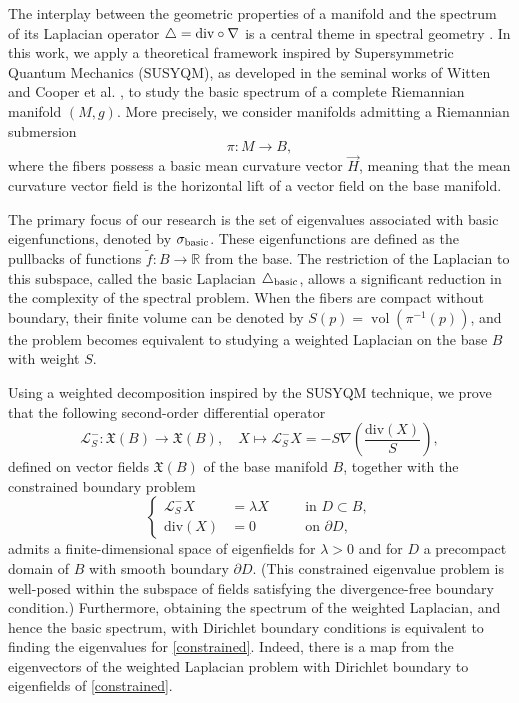 \documentclass{amsart}
\theoremstyle{definition}
\theoremstyle{remark}
\numberwithin{equation}{section}
\newcommand{\diver}{{{\mathrm{div}}}}
\begin{document}
The interplay between the geometric properties of a manifold and the spectrum of its Laplacian operator $\triangle={\rm div}\circ \nabla$ is a central theme in spectral geometry \cite{Chavel, Kac, Pol2, YauReview}. In this work, we apply a theoretical framework inspired by Supersymmetric Quantum Mechanics (SUSYQM), as developed in the seminal works of Witten \cite{Witten1982} and Cooper et al. \cite{CooperKhareSukhatme1995}, to study the basic spectrum of a complete Riemannian manifold $(M, g)$. More precisely, we consider manifolds admitting a Riemannian submersion 
\begin{equation}
\pi\colon M \to B,
\end{equation}
where the fibers possess a basic mean curvature vector $\vec{H}$, meaning that the mean curvature vector field is the horizontal lift of a vector field on the base manifold.

The primary focus of our research is the set of eigenvalues associated with basic eigenfunctions, denoted by $\sigma_{\rm basic}$. These eigenfunctions are defined as the pullbacks of functions $\widetilde{f}: B \to \mathbb{R}$ from the base. The restriction of the Laplacian to this subspace, called the basic Laplacian $\triangle_{\rm basic}$, allows a significant reduction in the complexity of the spectral problem. When the fibers are compact without boundary, their finite volume can be denoted by $S(p)=\operatorname{vol}(\pi^{-1}(p))$, and the problem becomes equivalent to studying a weighted Laplacian on the base $B$ with weight $S$.

Using a weighted decomposition inspired by the SUSYQM technique, we prove that the following second-order differential operator 
$$
\mathscr{L}_S^{-}:\mathfrak{X}(B)\to \mathfrak{X}(B),\quad X\mapsto\mathscr{L}_S^{-}X=-S \nabla\left( \frac{\diver(X)}{S} \right),
$$ 
defined on vector fields $\mathfrak{X}(B)$ of the base manifold $B$, together with the constrained boundary problem
\begin{equation}\label{constrained}
\left\{
\begin{aligned}
\mathscr{L}_S^{-}X &= \lambda X \quad &&\text{in } D\subset B,\\
\diver(X) &= 0 \quad &&\text{on } \partial D,
\end{aligned}
\right.
\end{equation}
admits a finite-dimensional space of eigenfields for $\lambda>0$ and for $D$ a precompact domain of $B$ with smooth boundary $\partial D$. (This constrained eigenvalue problem is well-posed within the subspace of fields satisfying the divergence-free boundary condition.) Furthermore, obtaining the spectrum of the weighted Laplacian, and hence the basic spectrum, with Dirichlet boundary conditions is equivalent to finding the eigenvalues for \eqref{constrained}. Indeed, there is a map from the eigenvectors of the weighted Laplacian problem with Dirichlet boundary to eigenfields of \eqref{constrained}.
\end{document}
